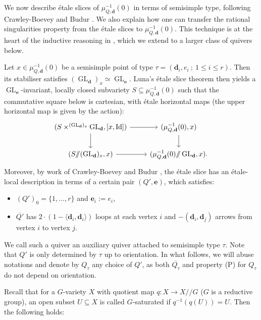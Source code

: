 \documentclass[11pt,english]{article}
\numberwithin{equation}{section}
\numberwithin{figure}{section}
\theoremstyle{definition}
\theoremstyle{plain}
\theoremstyle{remark}
\DeclareMathOperator{\Id}{Id}
\DeclareMathOperator{\GL}{GL}
\newcommand\dd{\mathbf{d}}
\newcommand\ee{\mathbf{e}}
\newcommand\git{/\!\!/}
\begin{document}
We now describe étale slices of $\mu_{Q,\dd}^{-1}(0)$ in terms of
semisimple type, following Crawley-Boevey \cite{CB03a} and Budur
\cite{Bud21}. We also explain how one can transfer the rational singularities
property from the étale slices to $\mu_{Q,\dd}^{-1}(0)$. This technique
is at the heart of the inductive reasoning in \cite{Bud21}, which
we extend to a larger class of quivers below.

Let $x\in\mu_{Q,\dd}^{-1}(0)$ be a semisimple point of type $\tau=(\dd_{i},e_{i}\ ;\ 1\leq i\leq r)$.
Then its stabiliser satisfies $(\GL_{\dd})_{x}\simeq\GL_{\ee}$. Luna's
étale slice theorem \cite{Lun73} then yields a $\GL_{\ee}$-invariant,
locally closed subvariety $S\subseteq\mu_{Q,\dd}^{-1}(0)$ such that
the commutative square below is cartesian, with étale horizontal maps
(the upper horizontal map is given by the action):\[
\begin{tikzcd}[ampersand replacement = \&]
(S\times^{(\GL_{\dd})_x}\GL_{\dd},[x,\Id]) \ar[r]\ar[d] \& (\mu_{Q,\dd}^{-1}(0),x) \ar[d] \\
(S\git (\GL_{\dd})_x,x) \ar[r] \& (\mu_{Q,\dd}^{-1}(0)\git\GL_{\dd},x).
\end{tikzcd}
\]Moreover, by work of Crawley-Boevey \cite{CB03a} and Budur \cite{Bud21},
the étale slice has an étale-local description in terms of a certain
pair $(Q',\ee)$, which satisfies:
\begin{itemize}
\item $(Q')_{0}=\{1,\ldots,r\}$ and $\ee_{i}:=e_{i}$,
\item $\overline{Q'}$ has $2\cdot(1-\langle\dd_{i},\dd_{i}\rangle)$ loops
at each vertex $i$ and $-(\dd_{i},\dd_{j})$ arrows from vertex $i$
to vertex $j$.
\end{itemize}
We call such a quiver an auxiliary quiver attached to semisimple type
$\tau$. Note that $Q'$ is only determined by $\tau$ up to orientation.
In what follows, we will abuse notations and denote by $Q_{\tau}$
any choice of $Q'$, as both $\overline{Q_{\tau}}$ and property (P)
for $Q_{\tau}$ do not depend on orientation.

Recall that for a $G$-variety $X$ with quotient map $q:X\rightarrow X\git G$
($G$ is a reductive group), an open subset $U\subseteq X$ is called
$G$-saturated if $q^{-1}(q(U))=U$. Then the following holds:
\end{document}
